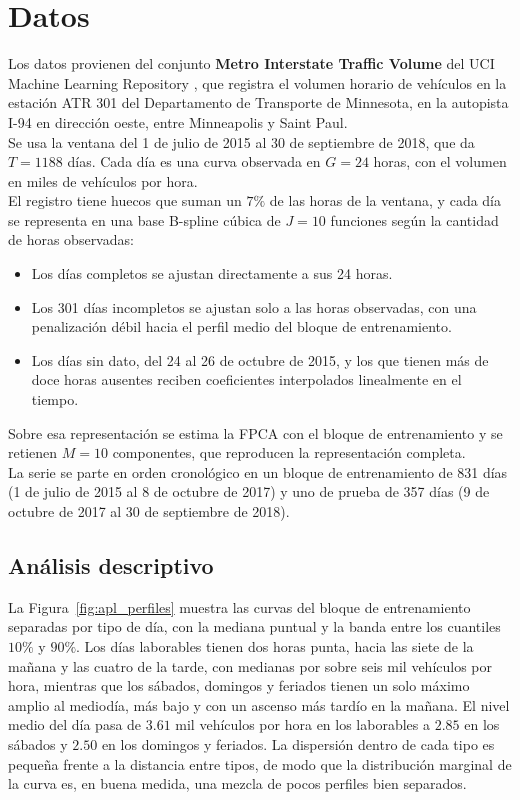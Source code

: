 \section{Datos}
\label{04_01_00_datos}

Los datos provienen del conjunto \textbf{Metro Interstate Traffic Volume} del UCI Machine Learning Repository \citep{04_01_hogue2019metro}, que registra el volumen horario de vehículos en la estación ATR 301 del Departamento de Transporte de Minnesota, en la autopista I-94 en dirección oeste, entre Minneapolis y Saint Paul.\\

Se usa la ventana del 1 de julio de 2015 al 30 de septiembre de 2018, que da $T = 1188$ días. Cada día es una curva observada en $G = 24$ horas, con el volumen en miles de vehículos por hora.\\

El registro tiene huecos que suman un $7\%$ de las horas de la ventana, y cada día se representa en una base B-spline cúbica de $J = 10$ funciones según la cantidad de horas observadas:
\begin{itemize}
    \item Los días completos se ajustan directamente a sus 24 horas.
    \item Los 301 días incompletos se ajustan solo a las horas observadas, con una penalización débil hacia el perfil medio del bloque de entrenamiento.
    \item Los días sin dato, del 24 al 26 de octubre de 2015, y los que tienen más de doce horas ausentes reciben coeficientes interpolados linealmente en el tiempo.
\end{itemize}
Sobre esa representación se estima la FPCA con el bloque de entrenamiento y se retienen $M = 10$ componentes, que reproducen la representación completa.\\

La serie se parte en orden cronológico en un bloque de entrenamiento de 831 días (1 de julio de 2015 al 8 de octubre de 2017) y uno de prueba de 357 días (9 de octubre de 2017 al 30 de septiembre de 2018).

\subsection{Análisis descriptivo}
\label{04_01_01_descriptivo}

La Figura~\ref{fig:apl_perfiles} muestra las curvas del bloque de entrenamiento separadas por tipo de día, con la mediana puntual y la banda entre los cuantiles $10\%$ y $90\%$. Los días laborables tienen dos horas punta, hacia las siete de la mañana y las cuatro de la tarde, con medianas por sobre seis mil vehículos por hora, mientras que los sábados, domingos y feriados tienen un solo máximo amplio al mediodía, más bajo y con un ascenso más tardío en la mañana. El nivel medio del día pasa de $3.61$ mil vehículos por hora en los laborables a $2.85$ en los sábados y $2.50$ en los domingos y feriados. La dispersión dentro de cada tipo es pequeña frente a la distancia entre tipos, de modo que la distribución marginal de la curva es, en buena medida, una mezcla de pocos perfiles bien separados.

